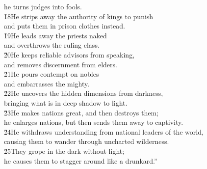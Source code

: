 \begin{poetry}
\poemll    he turns judges into fools. \\
\poeml \v{18}He strips away the authority of kings to punish \\
\poemll    and puts them in prison clothes instead. \\
\poeml \v{19}He leads away the priests naked \\
\poemll    and overthrows the ruling class. \\
\poeml \v{20}He keeps reliable advisors from speaking, \\
\poemll    and removes discernment from elders. \\
\poeml \v{21}He pours contempt on nobles \\
\poemll    and embarrasses the mighty. \\
\poeml \v{22}He uncovers the hidden dimensions from darkness, \\
\poemll    bringing what is in deep shadow to light. \\
\poeml \v{23}He makes nations great, and then destroys them; \\
\poemll    he enlarges nations, but then sends them away to captivity. \\
\poeml \v{24}He withdraws understanding from national leaders of the world, \\
\poemll    causing them to wander through uncharted wilderness. \\
\poeml \v{25}They grope in the dark without light; \\
\poemll    he causes them to stagger around like a drunkard.''
\end{poetry}


